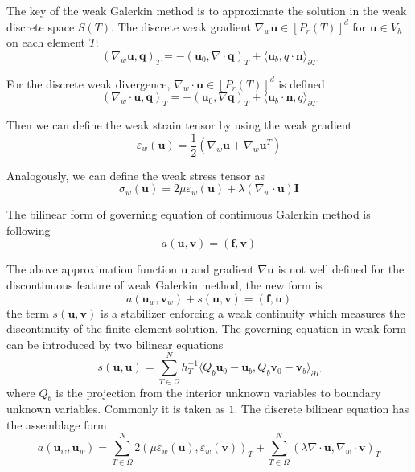 The key of the weak Galerkin method is to approximate the solution in the weak discrete space $ S(T) $. The discrete weak gradient $ \nabla_{w} \mathbf{u} \in [P_{r} (T)]^{d} $ for $ \mathbf{u} \in V_{h} $ on each element $ T $:
\begin{equation}
(\nabla_w \mathbf{u}, \mathbf{q})_{T} = - (\mathbf{u}_0, \nabla \cdot \mathbf{q})_{T} + \langle \mathbf{u}_b, q \cdot \mathbf{n} \rangle_{\partial T}
\end{equation}

For the discrete weak divergence, $ \nabla_{w} \cdot \mathbf{u} \in [P_{r} (T)]^{d} $ is defined
\begin{equation}
(\nabla_w \cdot \mathbf{u}, \mathbf{q})_{T} = - (\mathbf{u}_0, \nabla  \mathbf{q})_{T} + \langle \mathbf{u}_b \cdot \mathbf{n}, q  \rangle_{\partial T}
\end{equation}

Then we can define the weak strain tensor by using the weak gradient
\begin{equation}
\varepsilon_{w} (\mathbf{u})  = \frac{1}{2} (\nabla_w  \mathbf{u} + \nabla_w  \mathbf{u}^T)
\end{equation}

Analogously, we can define the weak stress tensor as
\begin{equation}
\sigma_{w} ( \mathbf{u}) = 2 \mu \varepsilon_{w} ( \mathbf{u}) + \lambda (\nabla_w \cdot  \mathbf{u}) \mathbf{I}
\end{equation}

The bilinear form of governing equation of continuous Galerkin method is following
\begin{equation}
a( \mathbf{u},  \mathbf{v}) = ( \mathbf{f},  \mathbf{v})
\end{equation}

The above approximation function $  \mathbf{u} $ and gradient $ \nabla \mathbf{u} $ is not well defined for the discontinuous feature of weak Galerkin method, the new form is 
\begin{equation}
a( \mathbf{u}_w,  \mathbf{v}_w) + s( \mathbf{u},  \mathbf{v}) = ( \mathbf{f},  \mathbf{u})
\end{equation}
the term $ s( \mathbf{u},  \mathbf{v}) $ is a stabilizer enforcing a weak continuity which measures the discontinuity of the finite element solution. The governing equation in weak form can be introduced by two bilinear equations
\begin{equation}
s( \mathbf{u},  \mathbf{u}) = \sum_{T\in \Omega}^{N} h_{T}^{-1} \langle Q_{b}  \mathbf{u}_0 -  \mathbf{u}_b, Q_b  \mathbf{v}_0 -  \mathbf{v}_b \rangle_{\partial T}
\end{equation}
where $ Q_b $ is the projection from the interior unknown variables to boundary unknown variables. Commonly it is taken as $ 1 $. The discrete bilinear equation has the assemblage form
\begin{equation}
a( \mathbf{u}_w,  \mathbf{u}_w) = \sum_{T \in \Omega}^{N} 2(\mu \varepsilon_w ( \mathbf{u}), \varepsilon_w ( \mathbf{v}))_T + \sum_{T \in \Omega}^{N}(\lambda \nabla \cdot \mathbf{u}, \nabla_w \cdot \mathbf{v})_T
\end{equation}



